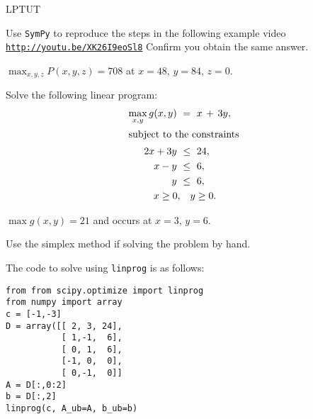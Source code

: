 
\begin{problems}{LPTUT}



	\begin{problem}
		Use \texttt{SymPy} to reproduce the steps in the following example video
		\href{http://youtu.be/XK26I9eoSl8}{\texttt{http://youtu.be/XK26I9eoSl8}}
		Confirm you obtain the same answer.

		\begin{answer}$\max_{x,y,z} P(x,y,z) = 708$ at 	$x=48$, $y=84$, $z=0$.\end{answer}

	\end{problem}


	\begin{problem}
		Solve the following linear program:
		\begin{align*}
			\max_{x,y} 	g(x,y) \ &=\  x  \, + \,  3y, \\
		\intertext{subject to the constraints}
					2x 	+ 3y	\ &\leq \		24,	\\
					x	- y	\ &\leq \	 	6,	\\
					           y	\ &\leq \	 	6,	\\
					x \geq 0, 	& \quad  	y \geq 0.
		\end{align*}

		\begin{answer}$\max g(x,y) = 21$ and occurs at $x=3$, $y=6$.\end{answer}

		\begin{solution}
			Use the simplex method if solving the problem by hand.

			The code to solve using \texttt{linprog} is as follows:
\begin{verbatim}
from from scipy.optimize import linprog
from numpy import array
c = [-1,-3]
D = array([[ 2, 3, 24],
           [ 1,-1,  6],
           [ 0, 1,  6],
           [-1, 0,  0],
           [ 0,-1,  0]]
A = D[:,0:2]
b = D[:,2]
linprog(c, A_ub=A, b_ub=b)
\end{verbatim}
		\end{solution}
	\end{problem}


\end{problems}